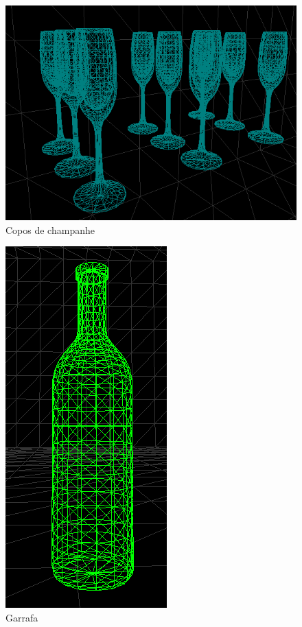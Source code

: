 \documentclass[a5paper,onecolumn, 11pt]{article}
\begin{document}
\begin{description}
\begin{figure}[!htb]
    \includegraphics[scale=0.7]{champanhe.png}
    \caption{Copos de champanhe}
\end{figure}
\begin{figure}[!htb]
    \centering
    \includegraphics[scale=0.7]{garrafa.png}
    \caption{Garrafa}
\end{figure}


\end{description}
\end{document}

